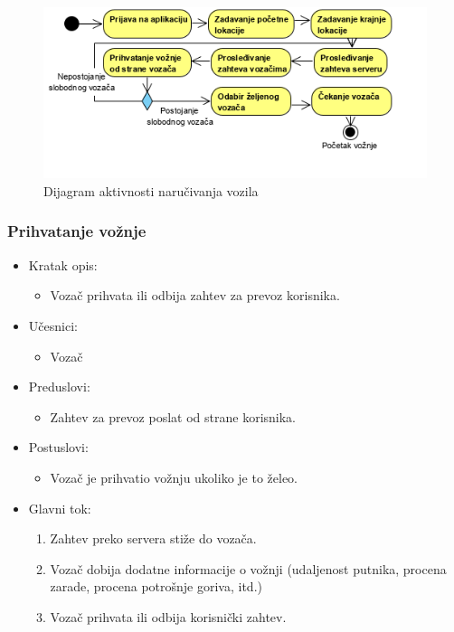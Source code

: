 \begin{figure}[H]
\begin{center}
\includegraphics[width=\textwidth]{Slike/NarucivanjeVozilaZaVoznju.png}
\end{center}
    \caption{Dijagram aktivnosti naručivanja vozila}
\label{fig:NaručivanjeVozila}
\end{figure}

\subsubsection{\bfseries Prihvatanje vožnje}

\begin{itemize}
	\item Kratak opis:
		\begin{itemize}
			\item Vozač prihvata ili odbija zahtev za prevoz korisnika.
		\end{itemize}
	\item Učesnici:
		\begin{itemize}
		    \item Vozač
		\end{itemize}			
	\item Preduslovi:
		\begin{itemize}
		    \item Zahtev za prevoz poslat od strane korisnika.
		\end{itemize}
	\item Postuslovi:
		\begin{itemize}
			\item Vozač je prihvatio vožnju ukoliko je to želeo.
		\end{itemize}		
	\item Glavni tok:
		\begin{enumerate}
		    \item Zahtev preko servera stiže do vozača.
		    \item Vozač dobija dodatne informacije o vožnji (udaljenost putnika, procena zarade, procena potrošnje goriva, itd.)
		    \item Vozač prihvata ili odbija korisnički zahtev.
		\end{enumerate}
\end{itemize}

